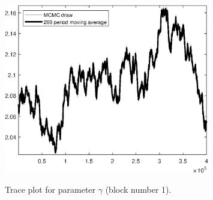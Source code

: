 \begin{figure}[H]
\centering
  \includegraphics[width=0.8\textwidth]{BRS_growth/graphs/TracePlot_gam_blck_1}\\
    \caption{Trace plot for parameter ${\gamma}$ (block number 1).}
\end{figure}
